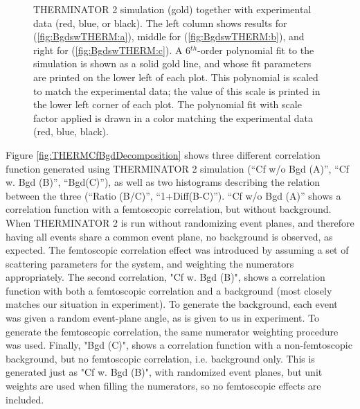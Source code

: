 \documentclass[../AnalysisNoteJBuxton.tex]{subfiles}
\begin{document}
\begin{figure}[h!]
  \caption[Backgrounds with THERMINATOR]{THERMINATOR 2 simulation (gold) together with experimental data (red, blue, or black).  The left column shows results for \LamKchP (\ref{fig:BgdswTHERM:a}), middle for \LamKchM (\ref{fig:BgdswTHERM:b}), and right for \LamKs (\ref{fig:BgdswTHERM:c}).  A 6$^{th}$-order polynomial fit to the simulation is shown as a solid gold line, and whose fit parameters are printed on the lower left of each plot.  This polynomial is scaled to match the experimental data; the value of this scale is printed in the lower left corner of each plot.  The polynomial fit with scale factor applied is drawn in a color matching the experimental data (red, blue, black).}
  \label{fig:BgdswTHERM}
\end{figure}


Figure \ref{fig:THERMCfBgdDecomposition} shows three different correlation function generated using THERMINATOR 2 simulation (``Cf w/o Bgd (A)'', ``Cf w. Bgd (B)'', ``Bgd(C)''), as well as two histograms describing the relation between the three (``Ratio (B/C)'', ``1+Diff(B-C)'').  ``Cf w/o Bgd (A)'' shows a correlation function with a femtoscopic correlation, but without background.  When THERMINATOR 2 is run without randomizing event planes, and therefore having all events share a common event plane, no background is observed, as expected.  The femtoscopic correlation effect was introduced by assuming a set of scattering parameters for the system, and weighting the numerators appropriately.  The second correlation, "Cf w. Bgd (B)", shows a correlation function with both a femtoscopic correlation and a background (most closely matches our situation in experiment).  To generate the background, each event was given a random event-plane angle, as is given to us in experiment.  To generate the femtoscopic correlation, the same numerator weighting procedure was used.  Finally, "Bgd (C)", shows a correlation function with a non-femtoscopic background, but no femtoscopic correlation, i.e. background only.  This is generated just as "Cf w. Bgd (B)", with randomized event planes, but unit weights are used when filling the numerators, so no femtoscopic effects are included.
\end{document}
